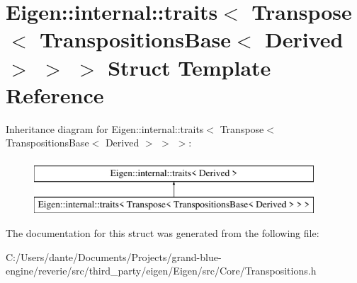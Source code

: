 \hypertarget{struct_eigen_1_1internal_1_1traits_3_01_transpose_3_01_transpositions_base_3_01_derived_01_4_01_4_01_4}{}\section{Eigen\+::internal\+::traits$<$ Transpose$<$ Transpositions\+Base$<$ Derived $>$ $>$ $>$ Struct Template Reference}
\label{struct_eigen_1_1internal_1_1traits_3_01_transpose_3_01_transpositions_base_3_01_derived_01_4_01_4_01_4}
Inheritance diagram for Eigen\+::internal\+::traits$<$ Transpose$<$ Transpositions\+Base$<$ Derived $>$ $>$ $>$\+:\begin{figure}[H]
\begin{center}
\leavevmode
\includegraphics[height=2.000000cm]{struct_eigen_1_1internal_1_1traits_3_01_transpose_3_01_transpositions_base_3_01_derived_01_4_01_4_01_4}
\end{center}
\end{figure}


The documentation for this struct was generated from the following file\+:\begin{DoxyCompactItemize}
\item 
C\+:/\+Users/dante/\+Documents/\+Projects/grand-\/blue-\/engine/reverie/src/third\+\_\+party/eigen/\+Eigen/src/\+Core/Transpositions.\+h\end{DoxyCompactItemize}
